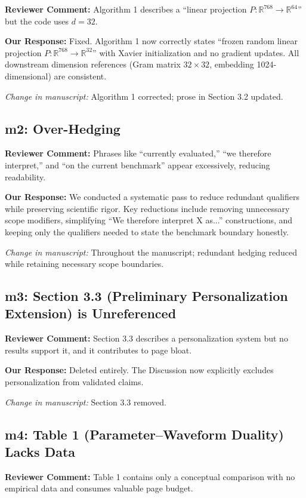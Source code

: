 \documentclass[11pt]{article}
\newcommand{\reviewer}[1]{\textcolor{reviewercolor}{\textbf{Reviewer Comment:} #1}}
\newcommand{\response}[1]{\textcolor{responsecolor}{\textbf{Our Response:} #1}}
\newcommand{\change}[1]{\textit{Change in manuscript:} #1}
\begin{document}
\reviewer{Algorithm 1 describes a ``linear projection $P: \mathbb{R}^{768} \to \mathbb{R}^{64}$'' but the code uses $d{=}32$.}

\response{Fixed. Algorithm 1 now correctly states ``frozen random linear projection $P: \mathbb{R}^{768} \to \mathbb{R}^{32}$'' with Xavier initialization and no gradient updates. All downstream dimension references (Gram matrix $32 \times 32$, embedding 1024-dimensional) are consistent.}

\change{Algorithm 1 corrected; prose in Section 3.2 updated.}

\subsection*{m2: Over-Hedging}

\reviewer{Phrases like ``currently evaluated,'' ``we therefore interpret,'' and ``on the current benchmark'' appear excessively, reducing readability.}

\response{We conducted a systematic pass to reduce redundant qualifiers while preserving scientific rigor. Key reductions include removing unnecessary scope modifiers, simplifying ``We therefore interpret X as...'' constructions, and keeping only the qualifiers needed to state the benchmark boundary honestly.}

\change{Throughout the manuscript; redundant hedging reduced while retaining necessary scope boundaries.}

\subsection*{m3: Section 3.3 (Preliminary Personalization Extension) is Unreferenced}

\reviewer{Section 3.3 describes a personalization system but no results support it, and it contributes to page bloat.}

\response{Deleted entirely. The Discussion now explicitly excludes personalization from validated claims.}

\change{Section 3.3 removed.}

\subsection*{m4: Table 1 (Parameter--Waveform Duality) Lacks Data}

\reviewer{Table 1 contains only a conceptual comparison with no empirical data and consumes valuable page budget.}
\end{document}
